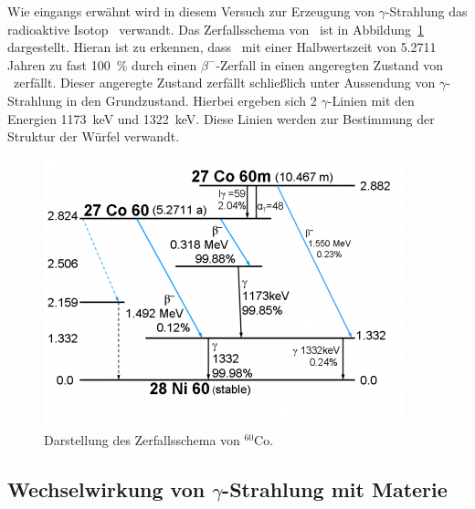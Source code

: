 Wie eingangs erwähnt wird in diesem Versuch zur Erzeugung von
$\gamma$-Strahlung das radioaktive Isotop \Co~verwandt.
Das Zerfallsschema von \Co~ist in Abbildung~\ref{fig:Co}
dargestellt.
Hieran ist zu erkennen, dass \Co~mit einer Halbwertszeit von 5.2711 Jahren
zu fast \SI{100}{\percent} durch einen
$\beta^-$-Zerfall in einen angeregten Zustand von \Ni~zerfällt.
Dieser angeregte Zustand zerfällt schließlich unter Aussendung von
$\gamma$-Strahlung in den Grundzustand.
Hierbei ergeben sich 2 $\gamma$-Linien mit den Energien \SI{1173}{\keV} und
\SI{1322}{\keV}. Diese Linien werden zur Bestimmung der Struktur der Würfel
verwandt.
\begin{figure}[t]
  \centering
  \includegraphics[scale=0.6]{bilder/393px-Co60DS.png}
  \caption{Darstellung des Zerfallsschema von $^{60}\text{Co}$.\cite{Co60}}
\label{fig:Co}
\end{figure}

\newpage
\subsection{Wechselwirkung von $\gamma$-Strahlung mit Materie}
\label{sub:wechselwirkung_von_gamma_strahlung_mit_materie}

